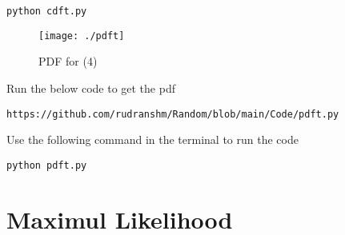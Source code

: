 \documentclass[journal,12pt,twocolumn]{IEEEtran}
\begin{document}
\begin{enumerate}[label=\thesection.\arabic*
,ref=\thesection.\theenumi]
\begin{lstlisting}
python cdft.py
\end{lstlisting}
\begin{figure}[h]
\texttt{[image: ./pdft]}
\caption{PDF for (4)}
\label{fig:T_PDF}
\end{figure}
Run the below code to get the pdf
\begin{lstlisting}
https://github.com/rudranshm/Random/blob/main/Code/pdft.py
\end{lstlisting}
Use the following command in the terminal to run the code
\begin{lstlisting}
python pdft.py
\end{lstlisting}
\end{enumerate}
\section{Maximul Likelihood}
\end{document}
